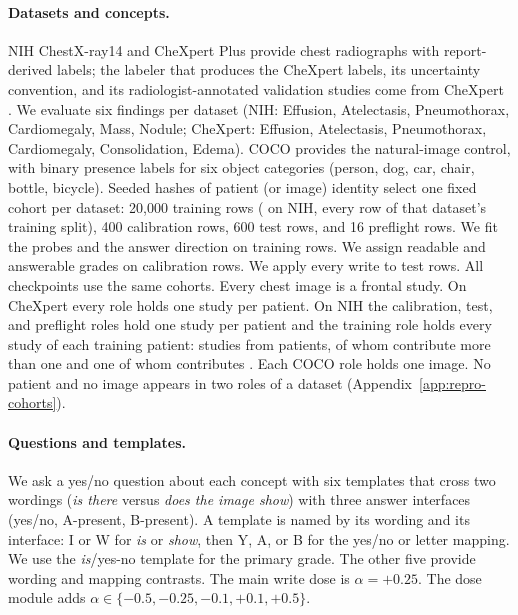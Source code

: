 \paragraph{Datasets and concepts.}
NIH ChestX-ray14 \citep{wang2017chestxray} and CheXpert Plus \citep{chambon2024chexpertplus} provide chest radiographs with report-derived labels; the labeler that produces the CheXpert labels, its uncertainty convention, and its radiologist-annotated validation studies come from CheXpert \citep{irvin2019chexpert}. We evaluate six findings per dataset (NIH: Effusion, Atelectasis, Pneumothorax, Cardiomegaly, Mass, Nodule; CheXpert: Effusion, Atelectasis, Pneumothorax, Cardiomegaly, Consolidation, Edema). COCO \citep{lin2014coco} provides the natural-image control, with binary presence labels for six object categories (person, dog, car, chair, bottle, bicycle). Seeded hashes of patient (or image) identity select one fixed cohort per dataset: 20{,}000 training rows (\cfCohortNihTrainRows{} on NIH, every row of that dataset's training split), 400 calibration rows, 600 test rows, and 16 preflight rows. We fit the probes and the answer direction on training rows. We assign readable and answerable grades on calibration rows. We apply every write to test rows. All checkpoints use the same cohorts. Every chest image is a frontal study. On CheXpert every role holds one study per patient. On NIH the calibration, test, and preflight roles hold one study per patient and the training role holds every study of each training patient: \cfCohortNihTrainRows{} studies from \cfCohortNihTrainUnits{} patients, \cfCohortNihTrainMulti{} of whom contribute more than one and one of whom contributes \cfCohortNihTrainMax{}. Each COCO role holds one image. No patient and no image appears in two roles of a dataset (Appendix~\ref{app:repro-cohorts}).

\paragraph{Questions and templates.}
We ask a yes/no question about each concept with six templates that cross two wordings (\emph{is there} versus \emph{does the image show}) with three answer interfaces (yes/no, A-present, B-present). A template is named by its wording and its interface: I or W for \emph{is} or \emph{show}, then Y, A, or B for the yes/no or letter mapping. We use the \emph{is}/yes-no template for the primary grade. The other five provide wording and mapping contrasts. The main write dose is $\alpha=+0.25$. The dose module adds $\alpha\in\{-0.5,-0.25,-0.1,+0.1,+0.5\}$.

